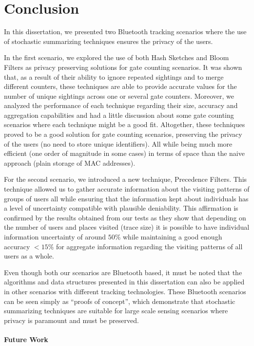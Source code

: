\chapter{Conclusion}
\label{cha:conclusion}

In this dissertation, we presented two Bluetooth tracking scenarios
where the use of stochastic summarizing techniques ensures the privacy
of the users.

In the first scenario, we explored the use of both Hash Sketches and
Bloom Filters as privacy preserving solutions for gate counting
scenarios.  It was shown that, as a result of their ability to ignore
repeated sightings and to merge different counters, these techniques
are able to provide accurate values for the number of unique sightings
across one or several gate counters.  Moreover, we analyzed the
performance of each technique regarding their size, accuracy and
aggregation capabilities and had a little discussion about some gate
counting scenarios where each technique might be a good
fit. Altogether, these techniques proved to be a good solution for gate
counting scenarios, preserving the privacy of the users (no need to
store unique identifiers). All while being much more efficient (one
order of magnitude in some cases) in terms of space than the naive
approach (plain storage of MAC addresses).


For the second scenario, we introduced a new technique, Precedence
Filters. This technique allowed us to gather accurate information
about the visiting patterns of groups of users all while ensuring that
the information kept about individuals has a level of uncertainty
compatible with plausible deniability.  This affirmation is confirmed
by the results obtained from our tests as they show that depending on
the number of users and places visited (trace size) it is possible to
have individual information uncertainty of around $50\%$ while
maintaining a good enough accuracy $  <15\%$ for aggregate information
regarding the visiting patterns of all users as a whole.


Even though both our scenarios are Bluetooth based, it must be noted
that the algorithms and data structures presented in this dissertation
can also be applied in other scenarios with different tracking
technologies. These Bluetooth scenarios can be seen simply as ``proofs of
concept'', which demonstrate that stochastic summarizing techniques are
suitable for large scale sensing scenarios where privacy is paramount
and must be preserved.


\subsubsection{Future Work}
\label{sec:future-work}

